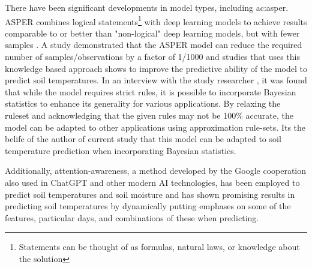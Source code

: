 There have been significant developments in model types, including \acrfull{ac:asper}. ASPER combines logical statements\footnote{Statements can be thought of as formulas, natural laws, or knowledge about the solution} with deep learning models to achieve results comparable to or better than "non-logical" deep learning models, but with fewer samples \cite{le_asper_2023}. A study demonstrated that the ASPER model can reduce the required number of samples/observations by a factor of 1/1000 \cite{machot_bridging_2023} and studies that uses this knowledge based approach shows to improve the predictive ability of the model to predict soil temperatures\cite{abimbola_knowledge-guided_2021,alizamir_advanced_2020}. In an interview with the study researcher \cite{fadi_al_machot_discussion_2024}, it was found that while the model requires strict rules, it is possible to incorporate Bayesian statistics to enhance its generality for various applications. By relaxing the ruleset and acknowledging that the given rules may not be 100\% accurate, the model can be adapted to other applications using approximation rule-sets. Its the belife of the author of current study that this model can be adapted to soil temperature prediction when incorporating Bayesian statistics.

Additionally, attention-awareness, a method developed by the Google cooperation \cite{vaswani_attention_2017} also used in ChatGPT and other modern AI technologies, has been employed to predict soil temperatures and soil moisture\cite{li_attention-aware_2022} and has shown promising results in predicting soil temperatures by dynamically putting emphases on some of the features, particular days, and combinations of these when predicting. 
